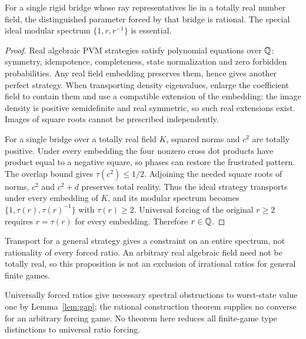 \begin{proposition}\label{prop:totallyreal}
For a single rigid bridge whose ray representatives lie in a totally real number field, the distinguished parameter forced by that bridge is rational. The special ideal modular spectrum $\{1,r,r^{-1}\}$ is essential.
\end{proposition}
\begin{proof}
Real algebraic PVM strategies satisfy polynomial equations over $\mathbb Q$: symmetry, idempotence, completeness, state normalization and zero forbidden probabilities. Any real field embedding preserves them, hence gives another perfect strategy. When transporting density eigenvalues, enlarge the coefficient field to contain them and use a compatible extension of the embedding: the image density is positive semidefinite and real symmetric, so such real extensions exist. Images of square roots cannot be prescribed independently.

For a single bridge over a totally real field $K$, squared norms and $c^2$ are totally positive. Under every embedding the four nonzero cross dot products have product equal to a negative square, so phases can restore the frustrated pattern. The overlap bound gives $\tau(c^2)\le1/2$. Adjoining the needed square roots of norms, $c^2$ and $c^2+d$ preserves total reality. Thus the ideal strategy transports under every embedding of $K$, and its modular spectrum becomes $\{1,\tau(r),\tau(r)^{-1}\}$ with $\tau(r)\ge2$. Universal forcing of the original $r\ge2$ requires $r=\tau(r)$ for every embedding. Therefore $r\in\mathbb Q$.
\end{proof}
Transport for a general strategy gives a constraint on an entire spectrum, not rationality of every forced ratio. An arbitrary real algebraic field need not be totally real, so this proposition is not an exclusion of irrational ratios for general finite games.

Universally forced ratios give necessary spectral obstructions to worst-state value one by Lemma~\ref{lem:gap}; the rational construction theorem supplies no converse for an arbitrary forcing game. No theorem here reduces all finite-game type distinctions to universal ratio forcing.
